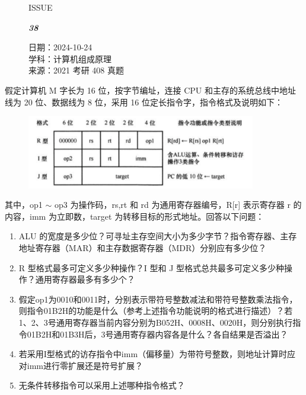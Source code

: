 \documentclass[UTF8]{ctexart}
\newcommand\Black[1]{\textcolor[gray]{0.3}{#1}}
\newcommand\Brown[1]{\textcolor[HTML]{998A4E}{#1}}
\newcommand\IssueNumber{38}
\newcommand\Date{2024-10-24}
\newcommand\Subject{计算机组成原理}
\newcommand\Source{2021 考研 408 真题}
\begin{document}
\begin{figure}[H]
\hspace{1cm}
\begin{minipage}[t]{0.3\textwidth}
\centering
    \Brown{\Genshin ISSUE}

    \vspace{-0.6cm}
    \Huge \Issue\slshape\bfseries\Black{\IssueNumber}
\end{minipage}
\hfill
\begin{minipage}[t]{0.35\textwidth}
\centering
    \Brown{日期：\Date} \\
\vspace{-0.1cm}
    \Brown{学科：\Subject} \\
\vspace{-0.1cm}
    \Brown{来源：\Source}
\end{minipage}
\hspace{0.8cm}
\end{figure}

{\color{cyan!50!black} 假定计算机 M 字长为 16 位，按字节编址，连接 CPU 和主存的系统总线中地址线为 20 位、数据线为 8 位，采用 16 位定长指令字，指令格式及说明如下：

\begin{figure}[htb]
    \centering
    \includegraphics[width=10cm]{题目.png}
\end{figure}

其中，op1 $\sim$ op3 为操作码，rs,rt 和 rd 为通用寄存器编号，R[r] 表示寄存器 r 的内容，imm 为立即数，target 为转移目标的形式地址。回答以下问题：

\begin{enumerate}
    \item  ALU 的宽度是多少位？可寻址主存空间大小为多少字节？指令寄存器、主存地址寄存器（MAR）和主存数据寄存器（MDR）分别应有多少位？
    \item R 型格式最多可定义多少种操作？I 型和 J 型格式总共最多可定义多少种操作？通用寄存器最多有多少个？
    \item 假定op1为0010和0011时，分别表示带符号整数减法和带符号整数乘法指令，则指令01B2H的功能是什么（参考上述指令功能说明的格式进行描述）？若1、2、3号通用寄存器当前内容分别为B052H、0008H、0020H，则分别执行指令01B2H和01B3H后，3号通用寄存器内容各是什么？各自结果是否溢出？
    \item 若采用I型格式的访存指令中imm（偏移量）为带符号整数，则地址计算时应对imm进行零扩展还是符号扩展？
    \item 无条件转移指令可以采用上述哪种指令格式？
\end{enumerate}

}
\end{document}
